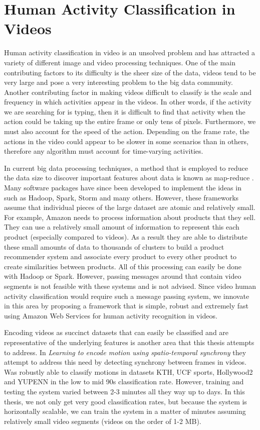 \section{\label{section:activity_classification}Human Activity Classification in Videos}
Human activity classification in video is an unsolved problem and has attracted
a variety of different image and video processing techniques. One of the main
contributing factors to its difficulty is the sheer size of the data, videos tend
to be very large and pose a very interesting problem to the big data community. Another contributing factor in
making videos difficult to classify is the scale and frequency in which activities
appear in the videos. In other words, if the activity we are searching for
is typing, then it is difficult to find that activity when the action
could be taking up the entire frame or only tens of pixels. Furthermore, we must
also account for the speed of the action. Depending on the frame rate, the
actions in the video could appear to be slower in some scenarios than in others,
therefore any algorithm must account for time-varying activities.

In current big data processing techniques, a method that is employed to reduce
the data size to discover important features about data is known as map-reduce
\cite{dean2008mapreduce}. Many software packages have since been developed to
implement the ideas in \cite{dean2008mapreduce} such as Hadoop, Spark, Storm
and many others. However, these frameworks assume that individual pieces of the
large dataset are atomic and relatively small. For example, Amazon needs to process
information about products that they sell. They can use a relatively small amount
of information to represent this each product (especially compared to videos).
As a result they are able to distribute these small amounts of data to thousands
of clusters to build a product recommender system and associate every product to
every other product to create similarities between products. All of this processing
can easily be done with Hadoop\cite{White:2009:HDG:1717298} or Spark. However,
passing messages around that contain video segments is not feasible with these
systems and is not advised. Since video human activity classification would
require such a message passing system, we innovate in this area by proposing a
framework that is simple, robust and extremely fast using Amazon Web Services
for human activity recognition in videos.

Encoding videos as succinct datasets that can easily be classified and are
representative of the underlying features is another area that this thesis
attempts to address. In \textit{Learning to encode motion using spatio-temporal
synchrony} \cite{konda2013learning} they attempt to address this need by detecting
synchrony between frames in videos. Was robustly able to classify motions in
datasets KTH, UCF sports, Hollywood2 and YUPENN in the low to mid 90s classification
rate. However, training and testing the system varied between 2-3 minutes all
they way up to days. In this thesis, we not only get very good classification
rates, but because the system is horizontally scalable, we can train the system
in a matter of minutes assuming relatively small video segments (videos on the
order of 1-2 MB).



